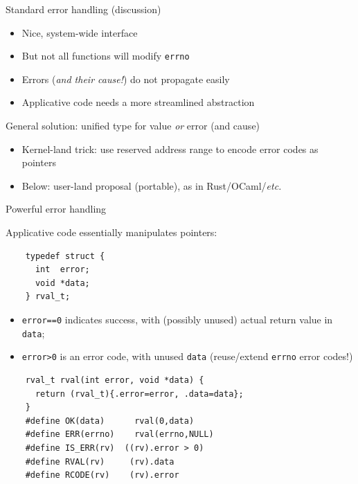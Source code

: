 \begin{frame}[fragile]{Standard error handling (discussion)}

  \begin{itemize}
  \item Nice, system-wide interface
  \item But not all functions will modify \lstinline{errno}
  \item Errors ({\em and their cause!}) do not propagate easily
  \item Applicative code needs a more streamlined abstraction
  \end{itemize}

  General solution: unified type for value {\em or} error (and cause)
  
  \begin{itemize}
  \item Kernel-land trick: use reserved address range to encode error codes as pointers
  \item Below: user-land proposal (portable), as in Rust/OCaml/{\em etc.}
  \end{itemize}
  
\end{frame}


\begin{frame}[fragile]{Powerful error handling}

  Applicative code essentially manipulates pointers:
  \begin{lstlisting}
    typedef struct {
      int  error;
      void *data;
    } rval_t;
  \end{lstlisting}

  \begin{itemize}
  \item \lstinline{error==0} indicates success, with (possibly unused) actual return value in \lstinline{data};
  \item \lstinline{error>0} is an error code, with unused \lstinline{data} (reuse/extend \lstinline{errno} error codes!)
  \end{itemize}
  
  \begin{lstlisting}
    rval_t rval(int error, void *data) {
      return (rval_t){.error=error, .data=data};
    }
    #define OK(data)      rval(0,data)
    #define ERR(errno)    rval(errno,NULL)
    #define IS_ERR(rv)  ((rv).error > 0)
    #define RVAL(rv)     (rv).data
    #define RCODE(rv)    (rv).error
  \end{lstlisting}

\end{frame}


